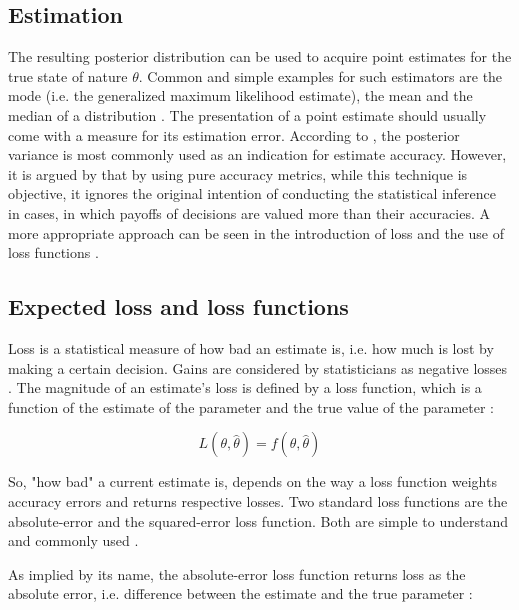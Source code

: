         \subsection{Estimation}
        The resulting posterior distribution can be used to acquire point estimates for the true state of nature $\theta$. Common and simple examples for such estimators are the mode (i.e. the generalized maximum likelihood estimate), the mean and the median of a distribution \citep{berger2013stat}. The presentation of a point estimate should usually come with a measure for its estimation error. According to \citet{berger2013stat}, the posterior variance is most commonly used as an indication for estimate accuracy. However, it is argued by \citet{davidson2015} that by using pure accuracy metrics, while this technique is objective, it ignores the original intention of conducting the statistical inference in cases, in which payoffs of decisions are valued more than their accuracies. A more appropriate approach can be seen in the introduction of loss and the use of loss functions \citep{davidson2015}.
        
        \subsection{Expected loss and loss functions}\label{sec:loss} 
        Loss is a statistical measure of how bad an estimate is, i.e. how much is lost by making a certain decision. Gains are considered by statisticians as negative losses \citep{davidson2015}.
        The magnitude of an estimate's loss is defined by a loss function, which is a function of the estimate of the parameter and the true value of the parameter \citep{davidson2015}:
        
        \begin{equation}\label{eq:LossFunction}
        L(\theta,\hat{\theta}) = f(\theta,\hat{\theta})
        \end{equation}
        
        So, "how bad" a current estimate is, depends on the way a loss function weights accuracy errors and returns respective losses. Two standard loss functions are the absolute-error and the squared-error loss function. Both are simple to understand and commonly used \citep{davidson2015}.
        
        As implied by its name, the absolute-error loss function returns loss as the absolute error, i.e. difference between the estimate and the true parameter \citep{davidson2015}:
        
